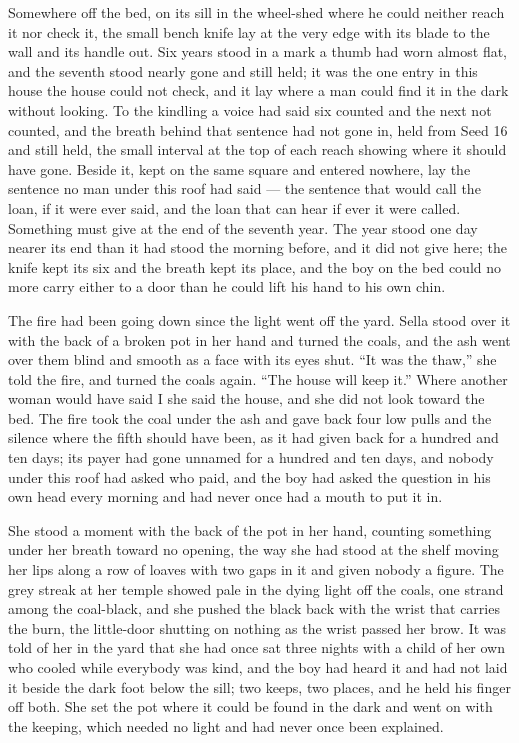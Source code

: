 Somewhere off the bed, on its sill in the wheel-shed where he could neither reach it nor check it, the small bench knife lay at the very edge with its blade to the wall and its handle out. Six years stood in a mark a thumb had worn almost flat, and the seventh stood nearly gone and still held; it was the one entry in this house the house could not check, and it lay where a man could find it in the dark without looking. To the kindling a voice had said six counted and the next not counted, and the breath behind that sentence had not gone in, held from Seed 16 and still held, the small interval at the top of each reach showing where it should have gone. Beside it, kept on the same square and entered nowhere, lay the sentence no man under this roof had said --- the sentence that would call the loan, if it were ever said, and the loan that can hear if ever it were called. Something must give at the end of the seventh year. The year stood one day nearer its end than it had stood the morning before, and it did not give here; the knife kept its six and the breath kept its place, and the boy on the bed could no more carry either to a door than he could lift his hand to his own chin.

The fire had been going down since the light went off the yard. Sella stood over it with the back of a broken pot in her hand and turned the coals, and the ash went over them blind and smooth as a face with its eyes shut. “It was the thaw,” she told the fire, and turned the coals again. “The house will keep it.” Where another woman would have said I she said the house, and she did not look toward the bed. The fire took the coal under the ash and gave back four low pulls and the silence where the fifth should have been, as it had given back for a hundred and ten days; its payer had gone unnamed for a hundred and ten days, and nobody under this roof had asked who paid, and the boy had asked the question in his own head every morning and had never once had a mouth to put it in.

She stood a moment with the back of the pot in her hand, counting something under her breath toward no opening, the way she had stood at the shelf moving her lips along a row of loaves with two gaps in it and given nobody a figure. The grey streak at her temple showed pale in the dying light off the coals, one strand among the coal-black, and she pushed the black back with the wrist that carries the burn, the little-door shutting on nothing as the wrist passed her brow. It was told of her in the yard that she had once sat three nights with a child of her own who cooled while everybody was kind, and the boy had heard it and had not laid it beside the dark foot below the sill; two keeps, two places, and he held his finger off both. She set the pot where it could be found in the dark and went on with the keeping, which needed no light and had never once been explained.

